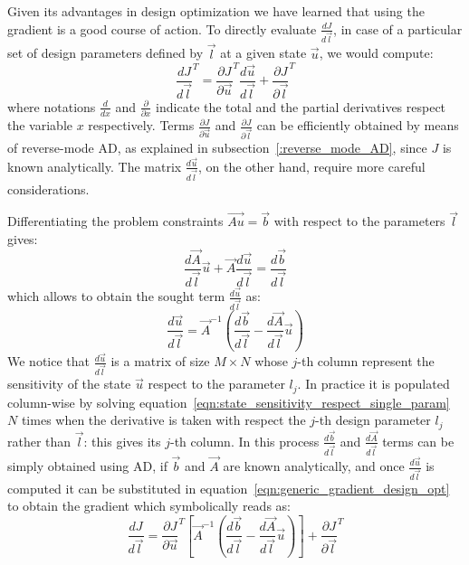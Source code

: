 \bigskip
Given its advantages in design optimization we have learned that using the gradient is a good course of action. To directly evaluate $\frac{dJ}{d\vec{l}}$, in case of a particular set of design parameters defined by $\vec{l}$ at a given state $\vec{u}$, we would compute:
\begin{equation}
	\label{eqn:generic_gradient_design_opt}
	\frac{dJ}{d\vec{l}}^T = \frac{\partial J}{\partial \vec{u}}^T \frac{d\vec{u}}{d\vec{l}} + \frac{\partial J}{\partial \vec{l}}^T
\end{equation}
where notations $\frac{d}{dx}$ and $\frac{\partial}{\partial x}$ indicate the total and the partial derivatives respect the variable $x$ respectively.
Terms $\frac{\partial J}{\partial \vec{u}}$ and $\frac{\partial J}{\partial \vec{l}}$ can be efficiently obtained by means of reverse-mode AD, as explained in subsection~\vref{:reverse_mode_AD}, since $J$ is known analytically. The matrix $\frac{d\vec{u}}{d\vec{l}}$, on the other hand, require more careful considerations.

Differentiating the problem constraints $\vec{Au} = \vec{b}$ with respect to the parameters $\vec{l}$ gives:
\begin{equation}
	\frac{d\vec{A}}{d\vec{l}} \vec{u} + \vec{A} \frac{d\vec{u}}{d\vec{l}} = \frac{d\vec{b}}{d\vec{l}}
\end{equation}
which allows to obtain the sought term $\frac{d\vec{u}}{d\vec{l}}$ as:
\begin{equation}
	\label{eqn:state_sensitivity_respect_single_param}
	\frac{d\vec{u}}{d\vec{l}} = \vec{A}^{-1} \left( \frac{d\vec{b}}{d\vec{l}} - \frac{d\vec{A}}{d\vec{l}}\vec{u} \right)
\end{equation}
We notice that $\frac{d\vec{u}}{d\vec{l}}$ is a matrix of size $M \times N$ whose $j$-th column represent the sensitivity of the state $\vec{u}$ respect to the parameter $l_j$. 
In practice it is populated column-wise by solving equation~\eqref{eqn:state_sensitivity_respect_single_param} $N$ times when the derivative is taken with respect the $j$-th design parameter $l_j$ rather than $\vec{l}$: this gives its $j$-th column. In this process $\frac{d\vec{b}}{d\vec{l}}$ and $\frac{d\vec{A}}{d\vec{l}}$ terms can be simply obtained using AD, if $\vec{b}$ and $\vec{A}$ are known analytically, and once $\frac{d\vec{u}}{d\vec{l}}$ is computed it can be substituted in equation~\eqref{eqn:generic_gradient_design_opt} to obtain the gradient which symbolically reads as:
\begin{equation}
	\label{eqn:generic_gradient_design_opt_naive}
	\frac{dJ}{d\vec{l}} = \frac{\partial J}{\partial \vec{u}}^T \left[ \vec{A}^{-1} \left( \frac{d\vec{b}}{d\vec{l}} - \frac{d\vec{A}}{d\vec{l}}\vec{u} \right) \right]  + \frac{\partial J}{\partial \vec{l}}^T
\end{equation}

